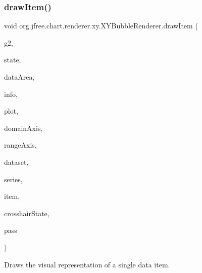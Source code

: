 \subsubsection{\texorpdfstring{draw\+Item()}{drawItem()}}
{\footnotesize\ttfamily void org.\+jfree.\+chart.\+renderer.\+xy.\+X\+Y\+Bubble\+Renderer.\+draw\+Item (\begin{DoxyParamCaption}\item[{Graphics2D}]{g2,  }\item[{\mbox{\hyperlink{classorg_1_1jfree_1_1chart_1_1renderer_1_1xy_1_1_x_y_item_renderer_state}{X\+Y\+Item\+Renderer\+State}}}]{state,  }\item[{Rectangle2D}]{data\+Area,  }\item[{\mbox{\hyperlink{classorg_1_1jfree_1_1chart_1_1plot_1_1_plot_rendering_info}{Plot\+Rendering\+Info}}}]{info,  }\item[{\mbox{\hyperlink{classorg_1_1jfree_1_1chart_1_1plot_1_1_x_y_plot}{X\+Y\+Plot}}}]{plot,  }\item[{\mbox{\hyperlink{classorg_1_1jfree_1_1chart_1_1axis_1_1_value_axis}{Value\+Axis}}}]{domain\+Axis,  }\item[{\mbox{\hyperlink{classorg_1_1jfree_1_1chart_1_1axis_1_1_value_axis}{Value\+Axis}}}]{range\+Axis,  }\item[{\mbox{\hyperlink{interfaceorg_1_1jfree_1_1data_1_1xy_1_1_x_y_dataset}{X\+Y\+Dataset}}}]{dataset,  }\item[{int}]{series,  }\item[{int}]{item,  }\item[{\mbox{\hyperlink{classorg_1_1jfree_1_1chart_1_1plot_1_1_crosshair_state}{Crosshair\+State}}}]{crosshair\+State,  }\item[{int}]{pass }\end{DoxyParamCaption})}

Draws the visual representation of a single data item.


